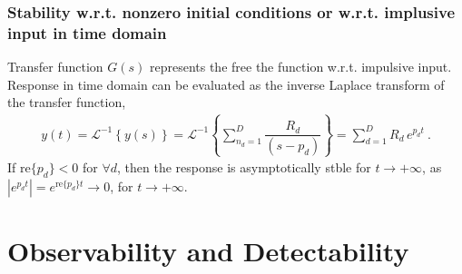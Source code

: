 \documentclass[letterpaper,10pt,english]{jupyterBook}
\begin{document}
\subsection{Stability w.r.t. non\sphinxhyphen{}zero initial conditions \sphinxhyphen{} or w.r.t. implusive input \sphinxhyphen{} in time domain}
\label{\detokenize{ch/system-theory/lti-stability-and-feedback:stability-w-r-t-non-zero-initial-conditions-or-w-r-t-implusive-input-in-time-domain}}\label{\detokenize{ch/system-theory/lti-stability-and-feedback:ode-lti-stability-fb-siso-impulsive-input}}
\sphinxAtStartPar
Transfer function \(G(s)\) represents the free the function w.r.t. impulsive input. Response in time domain can be evaluated as the inverse Laplace transform of the transfer function,
\begin{equation*}
\begin{split}y(t) = \mathscr{L}^{-1} \left\{ y(s) \right\} = \mathscr{L}^{-1} \left\{ \sum_{n_d=1}^{D} \dfrac{R_d}{(s-p_d)} \right\} = \sum_{d=1}^{D} R_d \, e^{p_d t} \ .\end{split}
\end{equation*}
\sphinxAtStartPar
If \(\text{re}\{ p_d \} < 0\) for \(\forall d\), then the response is asymptotically stble for \(t \rightarrow +\infty\), as \(|e^{p_d t}| = e^{\text{re}\{p_d\} t} \rightarrow 0\), for \(t \rightarrow + \infty\).

\sphinxstepscope


\chapter{Observability and Detectability}
\label{\detokenize{ch/system-theory/observability-detectability:observability-and-detectability}}\label{\detokenize{ch/system-theory/observability-detectability:observability-detectability}}\label{\detokenize{ch/system-theory/observability-detectability::doc}}
\end{document}
